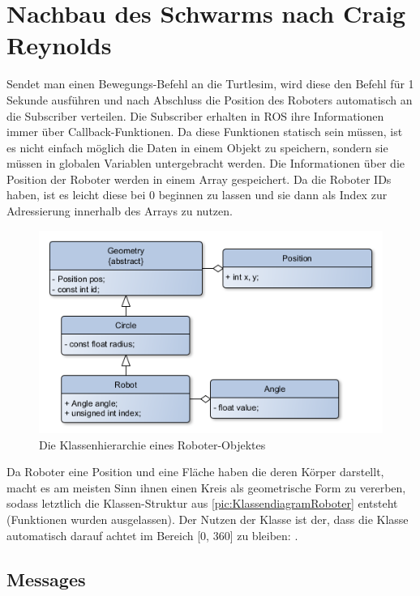 \section{Nachbau des Schwarms nach Craig Reynolds}

Sendet man einen Bewegungs-Befehl an die Turtlesim, wird diese den Befehl für 1 Sekunde ausführen und nach Abschluss die Position des Roboters automatisch an die Subscriber verteilen. Die Subscriber erhalten in \ac{ROS} ihre Informationen immer über Callback-Funktionen. Da diese Funktionen statisch sein müssen, ist es nicht einfach möglich die Daten in einem Objekt zu speichern, sondern sie müssen in globalen Variablen untergebracht werden.
Die Informationen über die Position der Roboter werden in einem Array gespeichert. Da die Roboter IDs haben, ist es leicht diese bei 0 beginnen zu lassen und sie dann als Index zur Adressierung innerhalb des Arrays zu nutzen.

\begin{figure}
	\includegraphics[width=\pictureWidthBig,keepaspectratio]{graphics/Klassendiagramme/KlassendiagrammRobot.png}
	\caption{Die Klassenhierarchie eines Roboter-Objektes}
	\label{pic:KlassendiagramRoboter}
\end{figure}

Da Roboter eine Position und eine Fläche haben die deren Körper darstellt, macht es am meisten Sinn ihnen einen Kreis als geometrische Form zu vererben, sodass letztlich die Klassen-Struktur aus \autoref{pic:KlassendiagramRoboter} entsteht (Funktionen wurden ausgelassen). Der Nutzen der Klasse  ist der, dass die Klasse automatisch darauf achtet im Bereich [0, 360] zu bleiben: .

\subsection*{Messages}

